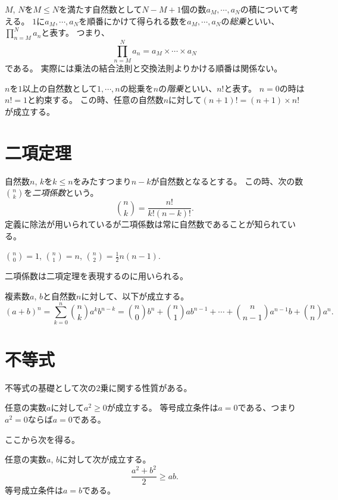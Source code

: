 $M$, $N$を$M \le N$を満たす自然数として$N-M+1$個の数$a_M, \cdots, a_N$の積について考える。
$1$に$a_M, \cdots, a_N$を順番にかけて得られる数を$a_M, \cdots, a_N$の\emph{総乗}といい、$\prod_{n = M}^N a_n$と表す。
つまり、
$$
\prod_{n = M}^N a_n = a_M\times\cdots\times a_N
$$
である。
実際には乗法の結合法則と交換法則よりかける順番は関係ない。

$n$を$1$以上の自然数として$1, \cdots, n$の総乗を$n$の\emph{階乗}といい、$n!$と表す。
$n = 0$の時は$n! = 1$と約束する。
この時、任意の自然数$n$に対して$(n+1)! = (n+1)\times n!$が成立する。

\section{二項定理}

自然数$n$, $k$を$k \le n$をみたすつまり$n-k$が自然数となるとする。
この時、次の数$\binom{n}{k}$を\emph{二項係数}という。
$$
\binom{n}{k} = \frac{n!}{k!(n-k)!}.
$$
定義に除法が用いられているが二項係数は常に自然数であることが知られている。

\begin{example}
$\binom{n}{0} = 1$, $\binom{n}{1} = n$, $\binom{n}{2} = \frac{1}{2}n(n-1)$.
\end{example}

二項係数は二項定理を表現するのに用いられる。

\begin{proposition}[二項定理]
複素数$a$, $b$と自然数$n$に対して、以下が成立する。
$$
(a+b)^n = \sum_{k = 0}^n \binom{n}{k}a^k b^{n-k} = \binom{n}{0}b^n+\binom{n}{1}a b^{n-1}+\cdots+\binom{n}{n-1}a^{n-1}b+\binom{n}{n}a^n.
$$
\end{proposition}

\section{不等式}

不等式の基礎として次の$2$乗に関する性質がある。

\begin{proposition}
任意の実数$a$に対して$a^2 \ge 0$が成立する。
等号成立条件は$a = 0$である、つまり$a^2 = 0$ならば$a = 0$である。
\end{proposition}

ここから次を得る。

\begin{proposition}
任意の実数$a$, $b$に対して次が成立する。
$$
\frac{a^2+b^2}{2} \ge a b.
$$
等号成立条件は$a = b$である。
\end{proposition}

